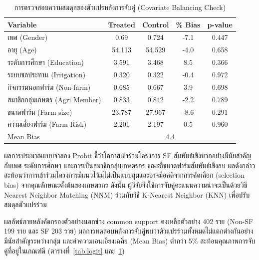 
\begin{table}[ht]
\centering
\small
\setlength{\tabcolsep}{4pt}
\renewcommand{\arraystretch}{1.1}

\caption{การตรวจสอบความสมดุลของตัวแปรหลังการจับคู่ (Covariate Balancing Check)}
\label{tab:balance}

\begin{tabular}{lcccc}
\hline
\textbf{Variable} & \textbf{Treated} & \textbf{Control} & \textbf{\% Bias} & \textbf{p-value} \\
\hline

เพศ (Gender) & 0.69 & 0.724 & -7.1 & 0.447 \\
อายุ (Age) & 54.113 & 54.529 & -4.0 & 0.658 \\
ระดับการศึกษา (Education) & 3.591 & 3.468 & 8.5 & 0.366 \\
ระบบชลประทาน (Irrigation) & 0.320 & 0.322 & -0.4 & 0.972 \\
กิจกรรมนอกฟาร์ม (Non-farm) & 0.685 & 0.667 & 3.9 & 0.698 \\
สมาชิกกลุ่มเกษตร (Agri Member) & 0.833 & 0.842 & -2.2 & 0.789 \\
ขนาดฟาร์ม (Farm size) & 23.787 & 27.967 & -8.6 & 0.291 \\
ความเสี่ยงฟาร์ม (Farm Risk) & 2.201 & 2.197 & 0.5 & 0.960 \\

\hline
Mean Bias & \multicolumn{4}{c}{4.4} \\
\hline
\end{tabular}
\end{table}


ผลการประมาณแบบจำลอง Probit ชี้ว่าโอกาสเข้าร่วมโครงการ SF สัมพันธ์เชิงบวกอย่างมีนัยสำคัญกับเพศ ระดับการศึกษา และการเป็นสมาชิกกลุ่มเกษตรกร ขณะที่ขนาดฟาร์มสัมพันธ์เชิงลบ 
ผลดังกล่าวสะท้อนว่าการเข้าร่วมโครงการมีแนวโน้มไม่เป็นแบบสุ่มและอาจมีอคติจากการคัดเลือก (selection bias) จากคุณลักษณะตั้งต้นของเกษตรกร ดังนั้น ผู้วิจัยจึงใช้การจับคู่คะแนนความน่าจะเป็นด้วยวิธี 
Nearest Neighbor Matching (NNM) ร่วมกับวิธี K-Nearest Neighbor (KNN) เพื่อปรับสมดุลตัวแปรร่วม

ผลลัพธ์ภายหลังคัดกรองตัวอย่างนอกช่วง common support คงเหลือตัวอย่าง 402 ราย (Non-SF 199 ราย และ SF 203 ราย) ผลการทดสอบหลังการจับคู่พบว่าตัวแปรร่วมทั้งหมดไม่แตกต่างกันอย่างมีนัยสำคัญระหว่างกลุ่ม 
และค่าความเอนเอียงเฉลี่ย (Mean Bias) ต่ำกว่า 5\% สะท้อนคุณภาพการจับคู่ที่อยู่ในเกณฑ์ดี (ตารางที่~\ref{tab:logit} และ~\ref{tab:balance})

